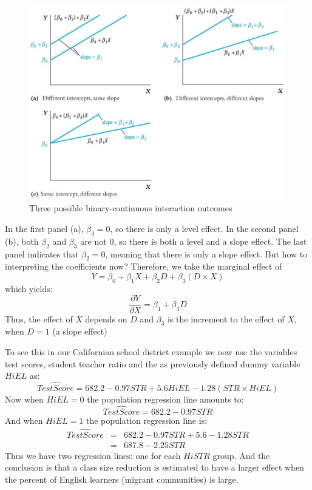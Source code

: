 \documentclass[
]{book}
\begin{document}
\begin{figure}

{\centering \includegraphics[width=600px]{./figures/Sheet44} 

}

\caption{Three possible binary-continuous interaction outcomes}\label{fig:interaction}
\end{figure}

In the first panel (a), \(\beta_3 = 0\), so there is only a level effect. In the second panel (b), both \(\beta_2\) and \(\beta_3\) are not 0, so there is both a level and a slope effect. The last panel indicates that \(\beta_2 = 0\), meaning that there is only a slope effect. But how to interpreting the coefficients now? Therefore, we take the marginal effect of
\begin{equation}
Y =\beta_0  + \beta_1 X  +\beta_2 D+ \beta_3 (D \times X)
\end{equation}
which yields:
\begin{equation}
\frac{\partial Y}{\partial X} = \beta_1 + \beta_3 D
\end{equation}
Thus, the effect of \(X\) depends on \(D\) and \(\beta_3\) is the increment to the effect of \(X\), when \(D = 1\) (a slope effect)

To see this in our Californian school district example we now use the variables test scores, student teacher ratio and the as previously defined dummy variable \(HiEL\) as:
\begin{equation}
\widehat{TestScore} = 682.2 - 0.97 STR + 5.6 HiEL - 1.28(STR \times HiEL) 
\end{equation}
Now when \(HiEL = 0\) the population regression line amounts to:
\begin{equation}
\widehat{TestScore} = 682.2 - 0.97 STR 
\end{equation}
And when \(HiEL = 1\) the population regression line is:
\begin{eqnarray}
\widehat{TestScore} &=& 682.2 - 0.97 STR + 5.6 - 1.28 STR \\
&=& 687.8 - 2.25 STR
\end{eqnarray}
Thus we have two regression lines: one for each \(HiSTR\) group. And the conclusion is that a class size reduction is estimated to have a larger effect when the percent of English learners (migrant communities) is large.
\end{document}

